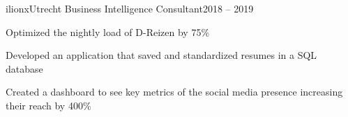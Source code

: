 \resumeSubheading
  {ilionx}{Utrecht}
  {Business Intelligence Consultant}{2018 – 2019}
  \vspace{\experienceItemSpacing}
  \resumeItemListStart
\item Optimized the nightly load of D-Reizen by 75\%
\item Developed an application that saved and standardized resumes in a SQL database
\item Created a dashboard to see key metrics of the social media presence increasing their reach by 400\%
  \resumeItemListEnd 